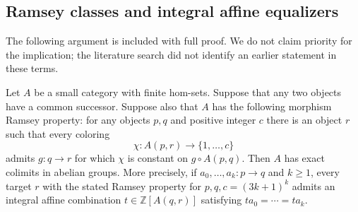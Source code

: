 \subsection{Ramsey classes and integral affine equalizers}

The following argument is included with full proof. We do not claim
priority for the implication; the literature search did not identify an
earlier statement in these terms.

\begin{theorem}
\label{OG:Ramsey-exact}
Let $A$ be a small category with finite hom-sets. Suppose that any two
objects have a common successor. Suppose also that $A$ has the following
morphism Ramsey property: for any objects $p,q$ and positive integer $c$
there is an object $r$ such that every coloring
\[
 \chi:A(p,r)\longrightarrow\{1,\ldots,c\}
\]
admits $g:q\to r$ for which $\chi$ is constant on
$g\circ A(p,q)$. Then $A$ has exact colimits in abelian groups.
More precisely, if $a_0,\ldots,a_k:p\to q$ and $k\geq1$, every target
$r$ with the stated Ramsey property for $p,q,c=(3k+1)^k$ admits an
integral affine combination $t\in\mathbb Z[A(q,r)]$ satisfying
$ta_0=\cdots=ta_k$.
\end{theorem}
